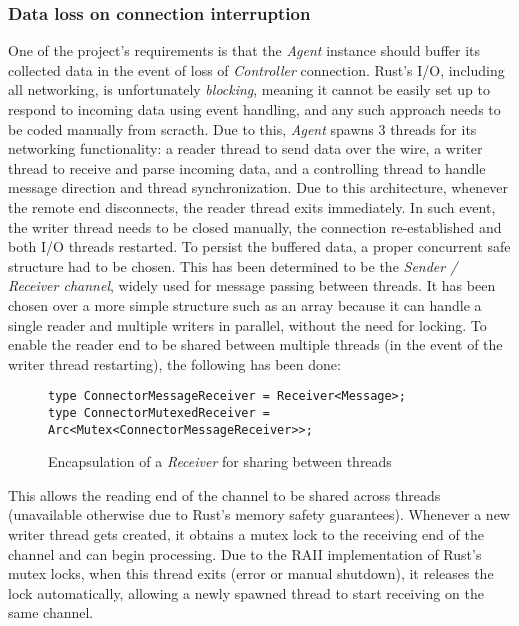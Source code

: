         
        \subsubsection{Data loss on connection interruption}
             One of the project's requirements is that the \textit{Agent} instance should buffer its collected data in the event of loss of \textit{Controller} connection. Rust's I/O, including all networking, is unfortunately \textit{blocking}, meaning it cannot be easily set up to respond to incoming data using event handling, and any such approach needs to be coded manually from scracth. Due to this, \textit{Agent} spawns 3 threads for its networking functionality: a reader thread to send data over the wire, a writer thread to receive and parse incoming data, and a controlling thread to handle message direction and thread synchronization. Due to this architecture, whenever the remote end disconnects, the reader thread exits immediately. In such event, the writer thread needs to be closed manually, the connection re-established and both I/O threads restarted. To persist the buffered data, a proper concurrent safe structure had to be chosen. This has been determined to be the \textit{Sender / Receiver channel}, widely used for message passing between threads. It has been chosen over a more simple structure such as an array because it can handle a single reader and multiple writers in parallel, without the need for locking. To enable the reader end to be shared between multiple threads (in the event of the writer thread restarting), the following has been done:
             
             \begin{figure}[!htb]
                \centering
                \begin{BVerbatim}
type ConnectorMessageReceiver = Receiver<Message>;
type ConnectorMutexedReceiver = Arc<Mutex<ConnectorMessageReceiver>>;
                \end{BVerbatim}
                \caption{Encapsulation of a \textit{Receiver} for sharing between threads}
                \label{fig:receiver-mutex}
            \end{figure}

            This allows the reading end of the channel to be shared across threads (unavailable otherwise due to Rust's memory safety guarantees). Whenever a new writer thread gets created, it obtains a mutex lock to the receiving end of the channel and can begin processing. Due to the RAII implementation of Rust's mutex locks, when this thread exits (error or manual shutdown), it releases the lock automatically, allowing a newly spawned thread to start receiving on the same channel.
